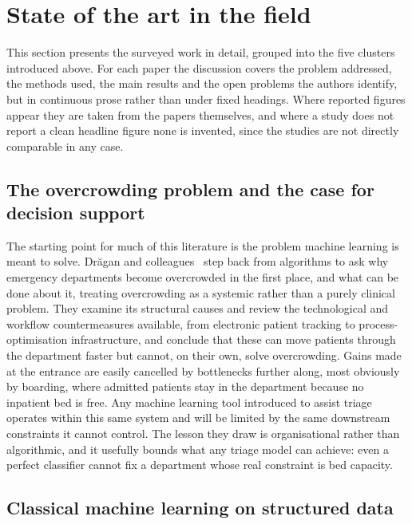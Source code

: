 \documentclass[11pt]{article}
\begin{document}
\section{State of the art in the field}
\label{sec:sota}

This section presents the surveyed work in detail, grouped into the five clusters introduced above. For each paper the discussion covers the problem addressed, the methods used, the main results and the open problems the authors identify, but in continuous prose rather than under fixed headings. Where reported figures appear they are taken from the papers themselves, and where a study does not report a clean headline figure none is invented, since the studies are not directly comparable in any case.

\subsection{The overcrowding problem and the case for decision support}

The starting point for much of this literature is the problem machine learning is meant to solve. Drăgan and colleagues~\cite{Dragan} step back from algorithms to ask why emergency departments become overcrowded in the first place, and what can be done about it, treating overcrowding as a systemic rather than a purely clinical problem. They examine its structural causes and review the technological and workflow countermeasures available, from electronic patient tracking to process-optimisation infrastructure, and conclude that these can move patients through the department faster but cannot, on their own, solve overcrowding. Gains made at the entrance are easily cancelled by bottlenecks further along, most obviously by boarding, where admitted patients stay in the department because no inpatient bed is free. Any machine learning tool introduced to assist triage operates within this same system and will be limited by the same downstream constraints it cannot control. The lesson they draw is organisational rather than algorithmic, and it usefully bounds what any triage model can achieve: even a perfect classifier cannot fix a department whose real constraint is bed capacity.

\subsection{Classical machine learning on structured data}
\end{document}
